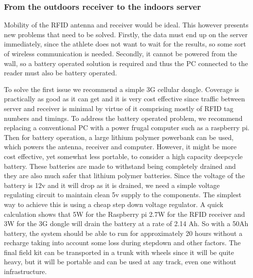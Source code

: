 \documentclass{article}
\begin{document}
\subsubsection{From the outdoors receiver to the indoors server}
Mobility of the RFID antenna and receiver would be ideal. This however presents new problems that need to be solved. Firstly, the data must end up on the server immediately, since the athlete does not want to wait for the results, so some sort of wireless communication is needed. Secondly, it cannot be powered from the wall, so a battery operated solution is required and thus the PC connected to the reader must also be battery operated.
\par
\bigskip
\noindent
To solve the first issue we recommend a simple 3G cellular dongle. Coverage is practically as good as it can get and it is very cost effective since traffic between server and receiver is minimal by virtue of it comprising mostly of RFID tag numbers and timings. To address the battery operated problem, we recommend replacing a conventional PC with a power frugal computer such as a raspberry pi. Then for battery operation, a large lithium polymer powerbank can be used, which powers the antenna, receiver and computer. However, it might be more cost effective, yet somewhat less portable, to consider a high capacity deepcycle battery. These batteries are made to withstand being completely drained and they are also much safer that lithium polymer batteries. Since the voltage of the battery is 12v and it will drop as it is drained, we need a simple voltage regulating circuit to maintain clean 5v supply to the components. The simplest way to achieve this is using a cheap step down voltage regulator. A quick calculation shows that 5W for the Raspberry pi 2.7W for the RFID receiver and 3W for the 3G dongle will drain the battery at a rate of 2.14 Ah. So with a 50Ah battery, the system should be able to run for approximately 20 hours without a recharge taking into account some loss during stepdown and other factors. The final field kit can be transported in a trunk with wheels since it will be quite heavy, but it will be portable and can be used at any track, even one without infrastructure.
 
\end{document}
